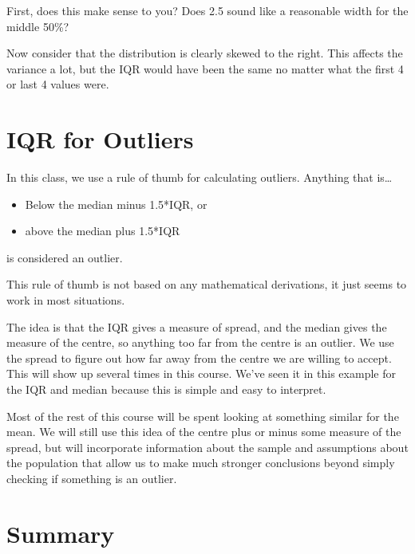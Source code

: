 \documentclass[
  letterpaper,
  DIV=11,
  numbers=noendperiod]{scrreprt}
\providecommand{\tightlist}{%
  \setlength{\itemsep}{0pt}\setlength{\parskip}{0pt}}\usepackage{longtable,booktabs,array}
\begin{document}
First, does this make sense to you? Does 2.5 sound like a reasonable
width for the middle 50\%?

Now consider that the distribution is clearly skewed to the right. This
affects the variance a lot, but the IQR would have been the same no
matter what the first 4 or last 4 values were.

\hypertarget{iqr-for-outliers}{%
\section{IQR for Outliers}\label{iqr-for-outliers}}

In this class, we use a rule of thumb for calculating outliers. Anything
that is\ldots{}

\begin{itemize}
\tightlist
\item
  Below the median minus 1.5*IQR, or
\item
  above the median plus 1.5*IQR
\end{itemize}

is considered an outlier.

This rule of thumb is not based on any mathematical derivations, it just
seems to work in most situations.

The idea is that the IQR gives a measure of spread, and the median gives
the measure of the centre, so anything too far from the centre is an
outlier. We use the spread to figure out how far away from the centre we
are willing to accept. This will show up several times in this course.
We've seen it in this example for the IQR and median because this is
simple and easy to interpret.

Most of the rest of this course will be spent looking at something
similar for the mean. We will still use this idea of the centre plus or
minus some measure of the spread, but will incorporate information about
the sample and assumptions about the population that allow us to make
much stronger conclusions beyond simply checking if something is an
outlier.

\hypertarget{summary-1}{%
\section{Summary}\label{summary-1}}
\end{document}
